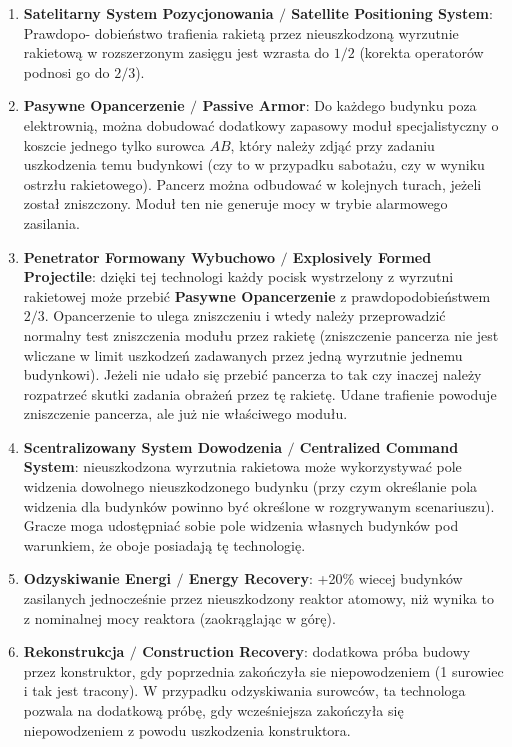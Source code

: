 \documentclass[11pt,a4paper]{article}
\begin{document}
\begin{enumerate}
\item \label{gps-tech} \textbf{Satelitarny System Pozycjonowania $/$ Satellite Positioning System}: Prawdopo- dobieństwo trafienia rakietą przez nieuszkodzoną wyrzutnie rakietową w rozszerzonym zasięgu jest  wzrasta do $1/2$ (korekta operatorów podnosi go do $2/3$).
\item \textbf{Pasywne Opancerzenie $/$ Passive Armor}: Do każdego budynku poza elektrownią, można dobudować dodatkowy zapasowy moduł specjalistyczny o koszcie jednego tylko surowca $AB$, który należy zdjąć przy zadaniu uszkodzenia temu budynkowi (czy to w przypadku sabotażu, czy w wyniku ostrzłu rakietowego). Pancerz można odbudować w kolejnych turach, jeżeli został zniszczony. Moduł ten nie generuje mocy w trybie alarmowego zasilania. 
\item \textbf{Penetrator Formowany Wybuchowo $/$ Explosively Formed Projectile}: dzięki tej technologi każdy pocisk wystrzelony z wyrzutni rakietowej może przebić \textbf{Pasywne Opancerzenie} z prawdopodobieństwem $2/3$. Opancerzenie to ulega zniszczeniu i wtedy należy przeprowadzić normalny test zniszczenia modułu przez rakietę (zniszczenie pancerza nie jest wliczane w limit uszkodzeń zadawanych przez jedną wyrzutnie jednemu budynkowi). Jeżeli nie udało się przebić pancerza to tak czy inaczej należy rozpatrzeć skutki zadania obrażeń przez tę rakietę. Udane trafienie powoduje zniszczenie pancerza, ale już nie właściwego modułu.
\item \textbf{Scentralizowany System Dowodzenia $/$ Centralized Command System}: nieuszkodzona wyrzutnia rakietowa może wykorzystywać pole widzenia dowolnego nieuszkodzonego budynku (przy czym określanie pola widzenia dla budynków powinno być określone w rozgrywanym scenariuszu). Gracze moga udostępniać sobie pole widzenia własnych budynków pod warunkiem, że oboje posiadają tę technologię.
\item \textbf{Odzyskiwanie Energi $/$ Energy Recovery}: +20\% wiecej budynków zasilanych jednocześnie przez nieuszkodzony reaktor atomowy, niż wynika to z nominalnej mocy reaktora (zaokrąglając w górę).
\item \textbf{Rekonstrukcja $/$ Construction Recovery}: dodatkowa próba budowy przez konstruktor, gdy poprzednia zakończyła sie niepowodzeniem (1 surowiec i tak jest tracony). W przypadku odzyskiwania surowców, ta technologa pozwala na dodatkową próbę, gdy wcześniejsza zakończyła się niepowodzeniem z powodu uszkodzenia konstruktora.

\end{enumerate}
\end{document}
